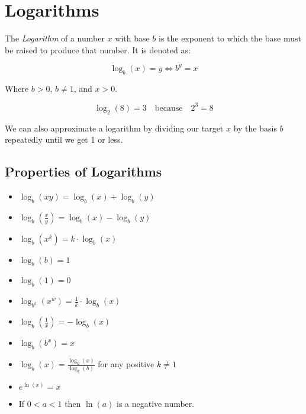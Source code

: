 \newpage
\section{Logarithms}

The \emph{Logarithm} of a number \(x\) 
with base \(b\) is the exponent to which the base must be raised to produce that number. It is 
denoted as:

\[
    \log_b(x) = y \iff b^y = x
\]

Where \(b > 0\), \(b \neq 1\), and \(x > 0\).

\[
    \log_2(8) = 3 \quad \text{because} \quad 2^3 = 8
\]

We can also approximate a logarithm by dividing our target \(x\) by the basis \(b\) repeatedly until 
we get 1 or less.

\subsection{Properties of Logarithms}

\begin{itemize}

    \item \(\log_b(xy) = \log_b(x) + \log_b(y)\)

    \item \(\log_b\left(\frac{x}{y}\right) = \log_b(x) - \log_b(y)\)

    \item \(\log_b(x^k) = k \cdot \log_b(x)\)

    \item \(\log_b(b) = 1\)

    \item \(\log_b(1) = 0\)

    \item \(\log_{b^k}(x^w) = \frac{1}{k} \cdot \log_b(x)\)

    \item \(\log_b\left(\frac{1}{x}\right) = -\log_b(x)\)

    \item \(\log_b(b^x) = x\)

    \item \(\log_b(x) = \frac{\log_k(x)}{\log_k(b)}\) for any positive \(k \neq 1\)

    \item \(e^{\ln(x)} = x\)

    \item If \(0 < a < 1\) then \(\ln(a)\) is a negative number. 

\end{itemize}

